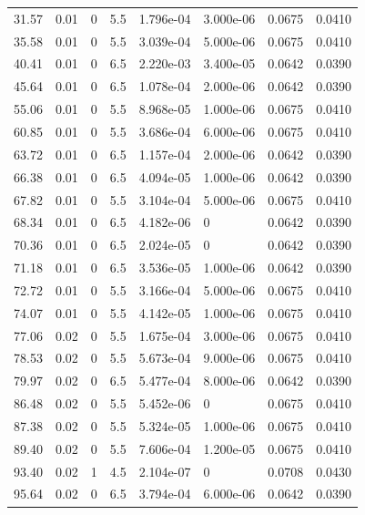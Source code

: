 \documentclass[preview]{standalone}
\begin{document}
{{\begin{tabular}{L{1.2cm}C{1.2cm} C{0.3cm}C{0.5cm} C{1.4cm}C{1.4cm} C{1.4cm}C{1.4cm}}
  31.57  &  0.01  & 0     & 5.5 &  1.796e-04  & 3.000e-06  & 0.0675 &  0.0410   \\ 
  35.58  &  0.01  & 0     & 5.5 &  3.039e-04  & 5.000e-06  & 0.0675 &  0.0410   \\ 
  40.41  &  0.01  & 0     & 6.5 &  2.220e-03  & 3.400e-05  & 0.0642 &  0.0390   \\ 
  45.64  &  0.01  & 0     & 6.5 &  1.078e-04  & 2.000e-06  & 0.0642 &  0.0390   \\ 
  55.06  &  0.01  & 0     & 5.5 &  8.968e-05  & 1.000e-06  & 0.0675 &  0.0410   \\ 
  60.85  &  0.01  & 0     & 5.5 &  3.686e-04  & 6.000e-06  & 0.0675 &  0.0410   \\ 
  63.72  &  0.01  & 0     & 6.5 &  1.157e-04  & 2.000e-06  & 0.0642 &  0.0390   \\ 
  66.38  &  0.01  & 0     & 6.5 &  4.094e-05  & 1.000e-06  & 0.0642 &  0.0390   \\ 
  67.82  &  0.01  & 0     & 5.5 &  3.104e-04  & 5.000e-06  & 0.0675 &  0.0410   \\ 
  68.34  &  0.01  & 0     & 6.5 &  4.182e-06  & 0  & 0.0642 &  0.0390   \\ 
  70.36  &  0.01  & 0     & 6.5 &  2.024e-05  & 0  & 0.0642 &  0.0390   \\ 
  71.18  &  0.01  & 0     & 6.5 &  3.536e-05  & 1.000e-06  & 0.0642 &  0.0390   \\ 
  72.72  &  0.01  & 0     & 5.5 &  3.166e-04  & 5.000e-06  & 0.0675 &  0.0410   \\ 
  74.07  &  0.01  & 0     & 5.5 &  4.142e-05  & 1.000e-06  & 0.0675 &  0.0410   \\ 
  77.06  &  0.02  & 0     & 5.5 &  1.675e-04  & 3.000e-06  & 0.0675 &  0.0410   \\ 
  78.53  &  0.02  & 0     & 5.5 &  5.673e-04  & 9.000e-06  & 0.0675 &  0.0410   \\ 
  79.97  &  0.02  & 0     & 6.5 &  5.477e-04  & 8.000e-06  & 0.0642 &  0.0390   \\ 
  86.48  &  0.02  & 0     & 5.5 &  5.452e-06  & 0  & 0.0675 &  0.0410   \\ 
  87.38  &  0.02  & 0     & 5.5 &  5.324e-05  & 1.000e-06  & 0.0675 &  0.0410   \\ 
  89.40  &  0.02  & 0     & 5.5 &  7.606e-04  & 1.200e-05  & 0.0675 &  0.0410   \\ 
  93.40  &  0.02  & 1     & 4.5 &  2.104e-07  & 0  & 0.0708 &  0.0430   \\ 
  95.64  &  0.02  & 0     & 6.5 &  3.794e-04  & 6.000e-06  & 0.0642 &  0.0390   \\ 

\end{tabular}}}
\end{document}
